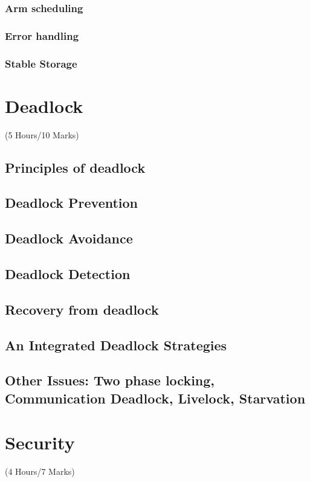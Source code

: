 \documentclass[12pt]{article}
\begin{document}
\subsubsection{Arm scheduling}
\subsubsection{Error handling}
\subsubsection{Stable Storage}

\pagebreak
\section{Deadlock}
\begin{center}(5 Hours/10 Marks)\end{center}
\subsection{Principles of deadlock}
\subsection{Deadlock Prevention}
\subsection{Deadlock Avoidance}
\subsection{Deadlock Detection}
\subsection{Recovery from deadlock}
\subsection{An Integrated Deadlock Strategies}
\subsection{Other Issues: Two phase locking, Communication Deadlock, Livelock, Starvation}

\pagebreak
\section{Security}
\begin{center}(4 Hours/7 Marks)\end{center}
\end{document}
